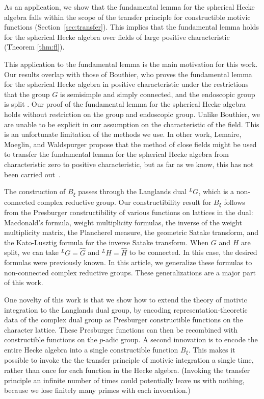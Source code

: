 As an application, we show that the fundamental lemma for the
spherical Hecke algebra falls within the scope of the transfer
principle for constructible motivic functions (Section~\ref{sec:transfer}).  This implies that the
fundamental lemma holds for the spherical Hecke algebra over fields of
large positive characteristic (Theorem \ref{thm:fl}).

This application to the fundamental lemma is the main motivation for
this work.  Our results overlap with those of Bouthier, who proves the
fundamental lemma for the spherical Hecke algebra in positive
characteristic under the restrictions that the group $G$ is semisimple
and simply connected, and the endoscopic group is split
\cite[Theorem~0.2]{bouthier}.  Our proof of the fundamental lemma for
the spherical Hecke algebra holds without restriction on the
group and endoscopic group.  Unlike Bouthier, we are unable to be
explicit in our assumption on the characteristic of the field.  This
is an unfortunate limitation of the methods we use.  In other work,
Lemaire, Moeglin, and Waldspurger propose that the method of close
fields might be used to transfer the fundamental lemma for the
spherical Hecke algebra from characteristic zero to positive
characteristic, but as far as we know, this has not been carried
out~\cite[\S1.3]{LMW}.

The construction of $B_\xi$ passes through the Langlands dual ${}^LG$,
which is a non-connected complex reductive group.  Our
constructibility result for $B_\xi$ follows from the Presburger
constructibility of various functions on lattices in the dual:
Macdonald's formula, weight multiplicity formulas, the inverse of the
weight multiplicity matrix, the Plancherel measure, the geometric
Satake transform, and the Kato-Lusztig formula for the inverse Satake
transform.  When $G$ and $H$ are split, we can take ${}^LG = \hat G$
and ${}^LH=\hat H$ to be connected.  In this case, the desired
formulas were previously known.  In this article, we generalize these
formulas to non-connected complex reductive groups.  These
generalizations are a major part of this work.

One novelty of this work is that we show how to extend the theory of
motivic integration to the Langlands dual group, by encoding
representation-theoretic data of the complex dual group as Presburger
constructible functions on the character lattice. These Presburger
functions can then be recombined with constructible functions on the
$p$-adic group.  A second innovation is to encode the entire Hecke
algebra into a single constructible function $B_\xi$.  This makes it
possible to invoke the the transfer principle of motivic integration a
single time, rather than once for each function in the Hecke algebra.
(Invoking the transfer principle an infinite number of times could
potentially leave us with nothing, because we lose finitely many
primes with each invocation.)

